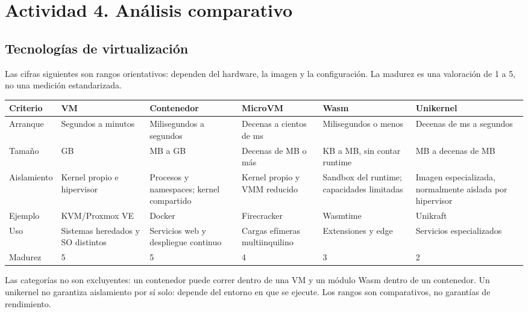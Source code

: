 \section{Actividad 4. Análisis comparativo}
\subsection{Tecnologías de virtualización}
Las cifras siguientes son rangos orientativos: dependen del hardware, la imagen y la configuración. La madurez es una valoración de 1 a 5, no una medición estandarizada.
\begin{longtable}{p{2.2cm}p{2cm}p{2cm}p{2cm}p{2cm}p{2cm}}
\textbf{Criterio} & \textbf{VM} & \textbf{Contenedor} & \textbf{MicroVM} & \textbf{Wasm} & \textbf{Unikernel} \\
\hline
Arranque & Segundos a minutos & Milisegundos a segundos & Decenas a cientos de ms & Milisegundos o menos & Decenas de ms a segundos \\
Tamaño & GB & MB a GB & Decenas de MB o más & KB a MB, sin contar runtime & MB a decenas de MB \\
Aislamiento & Kernel propio e hipervisor & Procesos y namespaces; kernel compartido & Kernel propio y VMM reducido & Sandbox del runtime; capacidades limitadas & Imagen especializada, normalmente aislada por hipervisor \\
Ejemplo & KVM/Proxmox VE & Docker & Firecracker & Wasmtime & Unikraft \\
Uso & Sistemas heredados y SO distintos & Servicios web y despliegue continuo & Cargas efímeras multiinquilino & Extensiones y edge & Servicios especializados \\
Madurez & 5 & 5 & 4 & 3 & 2 \\
\end{longtable}
Las categorías no son excluyentes: un contenedor puede correr dentro de una VM y un módulo Wasm dentro de un contenedor. Un unikernel no garantiza aislamiento por sí solo: depende del entorno en que se ejecute. Los rangos son comparativos, no garantías de rendimiento.

